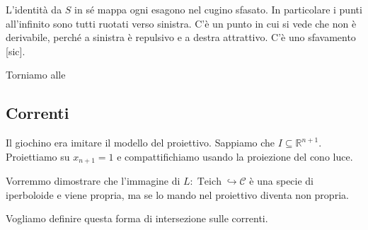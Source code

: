 \documentclass[a4paper]{article}
\theoremstyle{definition}
\DeclareMathOperator{\Teich}{Teich}
\begin{document}
L'identità da $S$ in sé mappa ogni esagono nel cugino sfasato. In particolare i punti all'infinito sono tutti ruotati verso sinistra. C'è un punto in cui si vede che non è derivabile, perché a sinistra è repulsivo e a destra attrattivo. C'è uno sfavamento [sic].

Torniamo alle
\subsection{Correnti}
    
Il giochino era imitare il modello del proiettivo. Sappiamo che $I \subseteq \mathbb R^{n + 1}$. Proiettiamo su $x_{n + 1} = 1$ e compattifichiamo usando la proiezione del cono luce.

Vorremmo dimostrare che l'immagine di $L: \Teich \hookrightarrow \mathcal C$ è una specie di iperboloide e viene propria, ma se lo mando nel proiettivo diventa non propria.

Vogliamo definire questa forma di intersezione sulle correnti.
\end{document}
